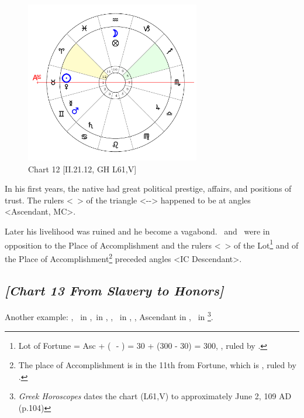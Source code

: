 \clearpage
\begin{figure}
\centering
\vspace{-20pt}
\includegraphics[width=0.68\textwidth]{charts/2_21_12}
\caption{Chart 12 [II.21.12, GH L61,V]}
\label{fig:chart12}
\end{figure}

In his first years, the native had great political prestige, affairs, and positions of trust. The rulers <\Venus\, \Moon> of the triangle <\Taurus-\Virgo-\Capricorn> happened to be at angles <Ascendant, MC>. 

Later his livelihood was ruined and he become a vagabond. \Mars\, and \Mercury\, were in opposition to the Place of Accomplishment and the rulers <\Saturn\, \Jupiter> of the Lot\footnote{Lot of Fortune = Asc + (\Moon\,\, - \Sun) = 30 + (300 - 30) = 300, \Aquarius, ruled by \Saturn.}
 and of the Place of Accomplishment\footnote{The place of Accomplishment is in the 11th from Fortune, which is \Sagittarius, ruled by \Jupiter.} preceded angles <IC Descendant>.
 
\newpage
\subsection*{\textit{[Chart 13 From Slavery to Honors]}}

Another example: \Sun, \Mercury\, in \Gemini,\Moon\, in \Capricorn, \Saturn, \Mars\, in \Aquarius, \Venus, Ascendant in \Cancer, \Jupiter\, in \Scorpio
\footnote{\textit{Greek Horoscopes} dates the chart (L61,V) to approximately June 2, 109 AD (p.104)}.

